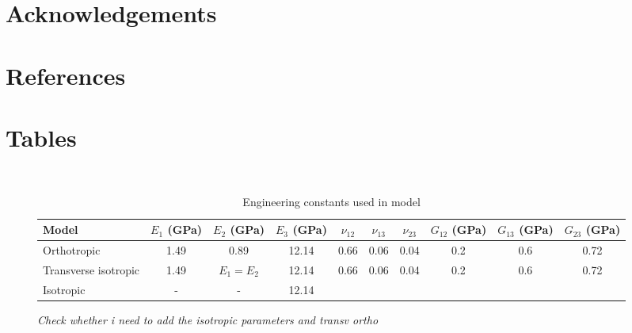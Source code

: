 \documentclass[review]{elsarticle}
\begin{document}
\section*{Acknowledgements}

\section*{References}


\pagebreak

\section*{Tables}

\begin{description}

\item[]
\begin{table}[ht]\
\caption{Engineering constants used in model} %
\centering %
\begin{tabular}{l c c c c c c c c c} %
\hline\hline %
Model & $E_{1}$ (GPa) & $E_{2}$ (GPa) & $E_{3}$ (GPa) & $\nu_{12}$ & $\nu_{13}$
& $\nu_{23}$ & $G_{12}$ (GPa) & $G_{13}$ (GPa) & $G_{23}$ (GPa) \\ %

\hline %
Orthotropic & 1.49 & 0.89 & 12.14 & 0.66 & 0.06 & 0.04 & 0.2 & 0.6 & 0.72 \\
Transverse isotropic & 1.49 & $E_1=E_2$ & 12.14 & 0.66 & 0.06 & 0.04 & 0.2 &
 0.6 & 0.72\\
Isotropic & - & - & 12.14 \\
 [1ex] %
\hline %
\end{tabular}
\label{table:nonlin} %
\end{table}

\it{\color{red}Check whether i need to add the isotropic parameters and transv
ortho}

\end{description}



\pagebreak


\end{document}
